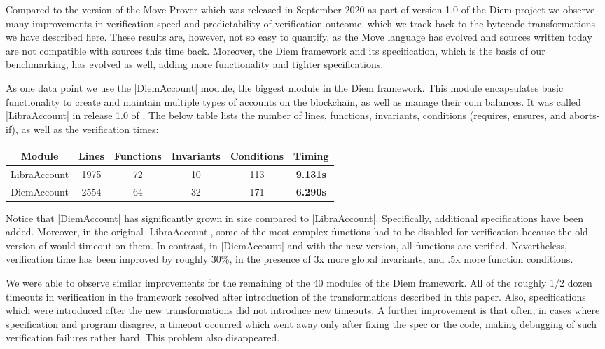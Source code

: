 

Compared to the version of the Move Prover which was released in September 2020
as part of version 1.0 of the Diem project we observe many improvements in
verification speed and predictability of verification outcome, which we track
back to the bytecode transformations we have described here. These results are,
however, not so easy to quantify, as the Move language has evolved and sources
written today are not compatible with sources this time back. Moreover, the Diem
framework and its specification, which is the basis of our benchmarking, has
evolved as well, adding more functionality and tighter specifications.

As one data point we use the |DiemAccount| module, the biggest module in the
Diem framework. This module encapsulates basic functionality to create and
maintain multiple types of accounts on the blockchain, as well as manage their
coin balances. It was called |LibraAccount| in release 1.0 of \MVP. The below
table lists the number of lines, functions, invariants, conditions (requires, ensures,
and aborts-if), as well as the verification times:

{
\setlength{\tabcolsep}{6pt}
\vspace{2ex}
\begin{tabular*}{0.9\textwidth}{cccccc}
  \hline
  \hline
  Module & Lines & Functions & Invariants & Conditions & Timing \\
  \hline
  LibraAccount & 1975 & 72 & 10 & 113 & \textbf{9.131s} \\
  DiemAccount & 2554 & 64 & 32 & 171 & \textbf{6.290s} \\
  \hline
\end{tabular*}
\vspace{2ex}
}

\noindent Notice that |DiemAccount| has significantly grown in size compared to
|LibraAccount|.  Specifically, additional specifications have been
added. Moreover, in the original |LibraAccount|, some of the most complex
functions had to be disabled for verification because the old version of \MVP
would timeout on them. In contrast, in |DiemAccount| and with the new version,
all functions are verified. Nevertheless, verification time has been improved by
roughly 30\%, in the presence of 3x more global invariants, and .5x more
function conditions.

We were able to observe similar improvements for the remaining of the 40 modules
of the Diem framework. All of the roughly 1/2 dozen timeouts in verification in
the framework resolved after introduction of the transformations described in
this paper. Also, specifications which were introduced after the new
transformations did not introduce new timeouts. A further improvement is that
often, in cases where specification and program disagree, a timeout occurred
which went away only after fixing the spec or the code, making debugging of such
verification failures rather hard. This problem also disappeared.



